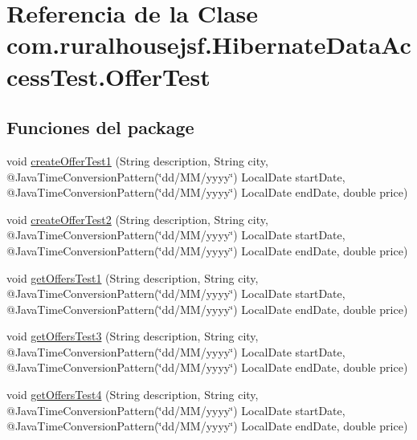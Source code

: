 \hypertarget{a00280}{}\section{Referencia de la Clase com.\+ruralhousejsf.\+Hibernate\+Data\+Access\+Test.\+Offer\+Test}
\label{a00280}
\subsection*{Funciones del \textquotesingle{}package\textquotesingle{}}
\begin{DoxyCompactItemize}
\item 
void \mbox{\hyperlink{a00280_a31d91d48cc672d2bb9739439c22eb213}{create\+Offer\+Test1}} (String description, String city, @Java\+Time\+Conversion\+Pattern(\char`\"{}dd/MM/yyyy\char`\"{}) Local\+Date start\+Date, @Java\+Time\+Conversion\+Pattern(\char`\"{}dd/MM/yyyy\char`\"{}) Local\+Date end\+Date, double price)
\item 
void \mbox{\hyperlink{a00280_a7f6665553642218567a9fd143c76a380}{create\+Offer\+Test2}} (String description, String city, @Java\+Time\+Conversion\+Pattern(\char`\"{}dd/MM/yyyy\char`\"{}) Local\+Date start\+Date, @Java\+Time\+Conversion\+Pattern(\char`\"{}dd/MM/yyyy\char`\"{}) Local\+Date end\+Date, double price)
\item 
void \mbox{\hyperlink{a00280_a5dc313dbb4fff4fd5e84b251acdddf05}{get\+Offers\+Test1}} (String description, String city, @Java\+Time\+Conversion\+Pattern(\char`\"{}dd/MM/yyyy\char`\"{}) Local\+Date start\+Date, @Java\+Time\+Conversion\+Pattern(\char`\"{}dd/MM/yyyy\char`\"{}) Local\+Date end\+Date, double price)
\item 
void \mbox{\hyperlink{a00280_ae7bee5891a0a3f569bc703193f0050a7}{get\+Offers\+Test3}} (String description, String city, @Java\+Time\+Conversion\+Pattern(\char`\"{}dd/MM/yyyy\char`\"{}) Local\+Date start\+Date, @Java\+Time\+Conversion\+Pattern(\char`\"{}dd/MM/yyyy\char`\"{}) Local\+Date end\+Date, double price)
\item 
void \mbox{\hyperlink{a00280_ad7d2deaa29db9f8cb13d0fbacb073223}{get\+Offers\+Test4}} (String description, String city, @Java\+Time\+Conversion\+Pattern(\char`\"{}dd/MM/yyyy\char`\"{}) Local\+Date start\+Date, @Java\+Time\+Conversion\+Pattern(\char`\"{}dd/MM/yyyy\char`\"{}) Local\+Date end\+Date, double price)
\end{DoxyCompactItemize}


